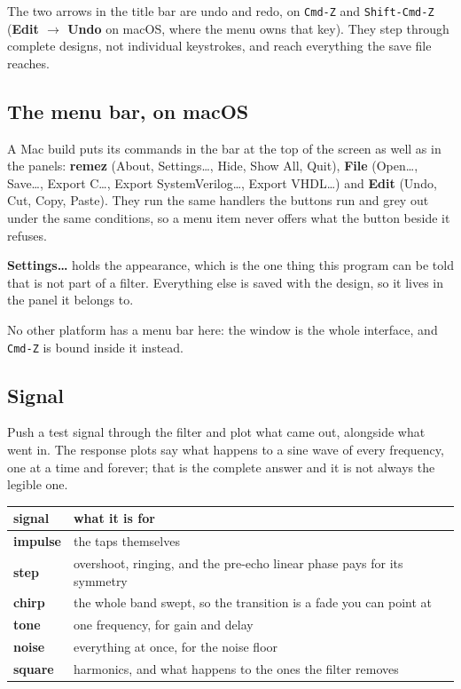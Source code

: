 \documentclass[11pt,a4paper]{article}
\newcommand{\ctl}[1]{\textbf{#1}}
\newcommand{\lit}[1]{\texttt{#1}}
\begin{document}
The two arrows in the title bar are undo and redo, on \lit{Cmd-Z} and
\lit{Shift-Cmd-Z} (\ctl{Edit $\rightarrow$ Undo} on macOS, where the menu owns
that key). They step through complete designs, not individual
keystrokes, and reach everything the save file reaches.

\subsection{The menu bar, on macOS}

A Mac build puts its commands in the bar at the top of the screen as well as in
the panels: \ctl{remez} (About, Settings\dots, Hide, Show All, Quit),
\ctl{File} (Open\dots, Save\dots, Export C\dots, Export SystemVerilog\dots,
Export VHDL\dots) and \ctl{Edit} (Undo, Cut, Copy, Paste). They run the same
handlers the buttons run and grey out under the same conditions, so a menu item
never offers what the button beside it refuses.

\ctl{Settings\dots} holds the appearance, which is the one thing this program
can be told that is not part of a filter. Everything else is saved with the
design, so it lives in the panel it belongs to.

No other platform has a menu bar here: the window is the whole interface, and
\lit{Cmd-Z} is bound inside it instead.

\subsection{Signal}

Push a test signal through the filter and plot what came out, alongside what
went in. The response plots say what happens to a sine wave of every frequency,
one at a time and forever; that is the complete answer and it is not always the
legible one.

\begin{tabularx}{\textwidth}{@{}lY@{}}
  \toprule
  \textbf{signal} & \textbf{what it is for} \\
  \midrule
  \ctl{impulse} & the taps themselves \\
  \ctl{step} & overshoot, ringing, and the pre-echo linear phase pays for its
    symmetry \\
  \ctl{chirp} & the whole band swept, so the transition is a fade you can point
    at \\
  \ctl{tone} & one frequency, for gain and delay \\
  \ctl{noise} & everything at once, for the noise floor \\
  \ctl{square} & harmonics, and what happens to the ones the filter removes \\
  \bottomrule
\end{tabularx}
\end{document}
